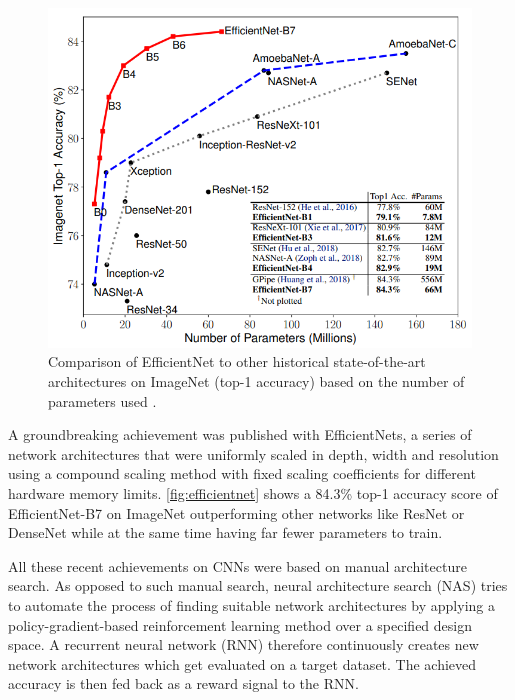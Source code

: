 \begin{figure}[t]
	\begin{center}
		\includegraphics[width=\linewidth]{images/efficientnet.PNG}
	\end{center}
	\caption{Comparison of EfficientNet to other historical state-of-the-art architectures on ImageNet (top-1 accuracy) based on the number of parameters used \cite{LeMingxingTan.2019}.}
	\label{fig:efficientnet}
\end{figure}

A groundbreaking achievement was published with EfficientNets, a series of network architectures that were uniformly scaled in depth, width and resolution using a compound scaling method with fixed scaling coefficients for different hardware memory limits. \autoref{fig:efficientnet} shows a 84.3\% top-1 accuracy score of EfficientNet-B7 on ImageNet \cite{JiaDeng.2009} outperforming other networks like ResNet or DenseNet while at the same time having far fewer parameters to train. \cite{LeMingxingTan.2019}

All these recent achievements on CNNs were based on manual architecture search. As opposed to such manual search, neural architecture search (NAS) tries to automate the process of finding suitable network architectures by applying a policy-gradient-based reinforcement learning method over a specified design space. A recurrent neural network (RNN) therefore continuously creates new network architectures which get evaluated on a target dataset. The achieved accuracy is then fed back as a reward signal to the RNN. \cite{LeBarretZoph.2017}

